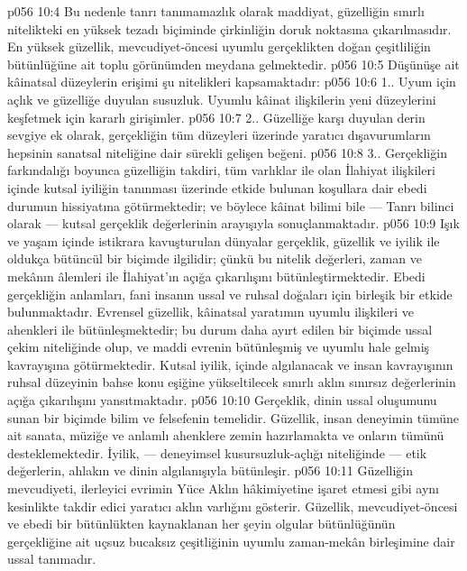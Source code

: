 \vs p056 10:4 Bu nedenle tanrı tanımamazlık olarak maddiyat, güzelliğin sınırlı nitelikteki en yüksek tezadı biçiminde çirkinliğin doruk noktasına çıkarılmasıdır. En yüksek güzellik, mevcudiyet\hyp{}öncesi uyumlu gerçeklikten doğan çeşitliliğin bütünlüğüne ait toplu görünümden meydana gelmektedir.
\vs p056 10:5 Düşünüşe ait kâinatsal düzeylerin erişimi şu nitelikleri kapsamaktadır:
\vs p056 10:6 1.\bibnobreakspace {}. Uyum için açlık ve güzelliğe duyulan susuzluk. Uyumlu kâinat ilişkilerin yeni düzeylerini keşfetmek için kararlı girişimler.
\vs p056 10:7 2.\bibnobreakspace {}. Güzelliğe karşı duyulan derin sevgiye ek olarak, gerçekliğin tüm düzeyleri üzerinde yaratıcı dışavurumların hepsinin sanatsal niteliğine dair sürekli gelişen beğeni.
\vs p056 10:8 3.\bibnobreakspace {}. Gerçekliğin farkındalığı boyunca güzelliğin takdiri, tüm varlıklar ile olan İlahiyat ilişkileri içinde kutsal iyiliğin tanınması üzerinde etkide bulunan koşullara dair ebedi durumun hissiyatına götürmektedir; ve böylece kâinat bilimi bile --- Tanrı bilinci olarak --- kutsal gerçeklik değerlerinin arayışıyla sonuçlanmaktadır.
\vs p056 10:9 Işık ve yaşam içinde istikrara kavuşturulan dünyalar gerçeklik, güzellik ve iyilik ile oldukça bütüncül bir biçimde ilgilidir; çünkü bu nitelik değerleri, zaman ve mekânın âlemleri ile İlahiyat’ın açığa çıkarılışını bütünleştirmektedir. Ebedi gerçekliğin anlamları, fani insanın ussal ve ruhsal doğaları için birleşik bir etkide bulunmaktadır. Evrensel güzellik, kâinatsal yaratımın uyumlu ilişkileri ve ahenkleri ile bütünleşmektedir; bu durum daha ayırt edilen bir biçimde ussal çekim niteliğinde olup, ve maddi evrenin bütünleşmiş ve uyumlu hale gelmiş kavrayışına götürmektedir. Kutsal iyilik, içinde algılanacak ve insan kavrayışının ruhsal düzeyinin bahse konu eşiğine yükseltilecek sınırlı aklın sınırsız değerlerinin açığa çıkarılışını yansıtmaktadır.
\vs p056 10:10 Gerçeklik, dinin ussal oluşumunu sunan bir biçimde bilim ve felsefenin temelidir. Güzellik, insan deneyimin tümüne ait sanata, müziğe ve anlamlı ahenklere zemin hazırlamakta ve onların tümünü desteklemektedir. İyilik, --- deneyimsel kusursuzluk\hyp{}açlığı niteliğinde --- etik değerlerin, ahlakın ve dinin algılanışıyla bütünleşir.
\vs p056 10:11 Güzelliğin mevcudiyeti, ilerleyici evrimin Yüce Aklın hâkimiyetine işaret etmesi gibi aynı kesinlikte takdir edici yaratıcı aklın varlığını gösterir. Güzellik, mevcudiyet\hyp{}öncesi ve ebedi bir bütünlükten kaynaklanan her şeyin olgular bütünlüğünün gerçekliğine ait uçsuz bucaksız çeşitliğinin uyumlu zaman\hyp{}mekân birleşimine dair ussal tanımadır.
